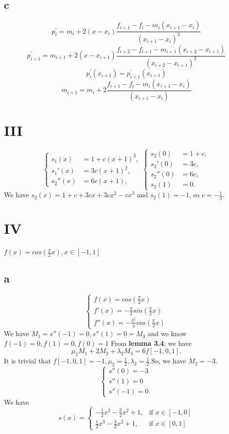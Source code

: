 \documentclass[a4paper]{article}
\begin{document}
\subsection*{c}
$$p^{'}_i = m_i + 2(x - x_i)\frac{f_{i+1}-f_i-m_i(x_{i+1}-x_i)}{(x_{i+1}-x_i)^2}$$
$$p^{'}_{i+1} = m_{i+1}+2(x - x_{i+1})\frac{f_{i+2}-f_{i+1}-m_{i+1}(x_{i+2}-x_{i+1})}{(x_{i+2}-x_{i+1})^2}$$
$$p^{'}_i(x_{i+1})=p^{'}_{i+1}(x_{i+1})$$
$$m_{i+1}= m_i + 2\frac{f_{i+1}-f_i-m_i(x_{i+1}-x_i)}{(x_{i+1}-x_i)}$$

\section*{III}
\[
\left\{
\begin{aligned}
s_1(x) &= 1 + c(x+1)^3, \\
s_1'(x) &= 3c(x+1)^2, \\
s_2''(x) &= 6c(x+1),
\end{aligned}
\right.
\left\{
\begin{aligned}
s_2(0) &= 1 + c, \\
s_2'(0) &= 3c, \\
s_2''(0) &= 6c, \\
s_2(1) &= 0.
\end{aligned}
\right.
\]
We have $s_2(x) = 1 + c + 3cx + 3cx^2 - cx^3$ and $s_2(1) = -1$, so $c = -\frac{1}{3}$.

\section*{IV}
$f(x) = cos(\frac{\pi }{2}x),x\in [-1,1]$
\subsection*{a}
\[
\left\{
\begin{aligned}
  f(x) = cos(\frac{\pi }{2}x)\\
  f'(x) = -\frac{\pi}{2}sin(\frac{\pi }{2}x)\\
  f''(x) = -\frac{\pi^2}{4}cos(\frac{\pi }{2}x)
\end{aligned}
\right.
\]
We have $M_1 = s''(-1) = 0, s''(1)=0=M_3$ and we know $f(-1)=0,f(1)=0,f(0) = 1$
From \textbf{lemma 3.4}, we have $$\mu_2M_1+2M_2+\lambda_2M_3 = 6f[-1,0,1].$$
It is trivial that $f[-1,0,1]=-1,\mu_2 = \frac{1}{2},\lambda_2 = \frac{1}{2}$.So, we have $M_2 = -3$.
\[
\left\{
\begin{aligned}
  s''(0) = -3\\
  s''(1) = 0\\
  s''(-1) = 0.
\end{aligned}
\right.
\]
We have 
\[s(x) = 
\begin{cases} 
-\frac{1}{2}x^3 - \frac{3}{2}x^2 + 1, & \text{if } x \in [-1,0] \\
\frac{1}{2}x^3 - \frac{3}{2}x^2 + 1, & \text{if } x \in [0,1]
\end{cases}\]
\end{document}
